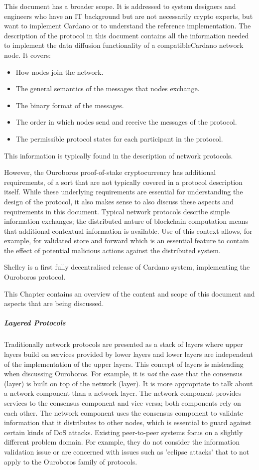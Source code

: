 \documentclass{report}
\newcommand{\wip}[1]{}
\theoremstyle{definition}{
  \newtheorem{lemma}{Lemma}[section] %
  \newtheorem{definition}[lemma]{Definition}
}
\theoremstyle{theorem}{
  \newtheorem{invariant}[lemma]{Invariant}
  \newtheorem{proofobligation}[lemma]{Proof Obligation}
}
\numberwithin{equation}{lemma}
\begin{document}
This document has a broader scope.
It is addressed to system designers and engineers who have an IT background
but are not necessarily crypto experts,
but want to implement Cardano or to understand the reference implementation.
The description of the protocol in this document contains all the information needed to
implement the data diffusion functionality of a compatibleCardano network node.
It covers:
\begin{itemize}
\item How nodes join the network.
\item The general semantics of the messages that nodes exchange.
\item The binary format of the messages.
\item The order in which nodes send and receive the messages of the protocol.
\item The permissible protocol states for each participant in the protocol.
\end{itemize}
This information is typically found in the description of network protocols.

However, the Ouroboros proof-of-stake cryptocurrency has additional requirements,
of a sort that are not typically covered in a
protocol  description itself.
While these underlying requirements are essential for understanding the design of the protocol,
it also makes sense to also discuss these aspects and requirements in this document.
Typical network protocols describe simple information exchanges;
the distributed nature of blockchain computation means
that additional contextual information is available.
Use of this context allows, for example, for validated store and forward
which is an essential feature to contain the effect of potential malicious actions
against the distributed system.

Shelley is a first fully decentralised release of Cardano system, implementing the Ouroboros protocol.

This Chapter contains an overview of the content and scope of this document and aspects that
are being discussed.

\wip{
\subparagraph{Software assurance}
Software assurance
}

\subparagraph{Layered Protocols}
Traditionally network protocols are presented as a stack of layers where
upper layers build on services provided by lower layers and lower layers
are independent of the implementation of the upper layers.
This concept of layers is misleading when discussing Ouroboros.
For example, it is {\em not} the case that the consensus (layer)
is built on top of the network (layer).
It is more appropriate to talk about a network component than a network layer.
The network component provides services to the consensus component and vice versa;
both components rely on each other.
The network component uses the consensus component to validate
information that it distributes to other nodes, which
is essential to guard against certain kinds of DoS attacks.
Existing peer-to-peer systems focus on a slightly different problem domain.
For example, they do not consider the information validation issue
or are concerned with issues such as 'eclipse attacks' that to not
apply to the Ouroboros family of protocols.
\end{document}

